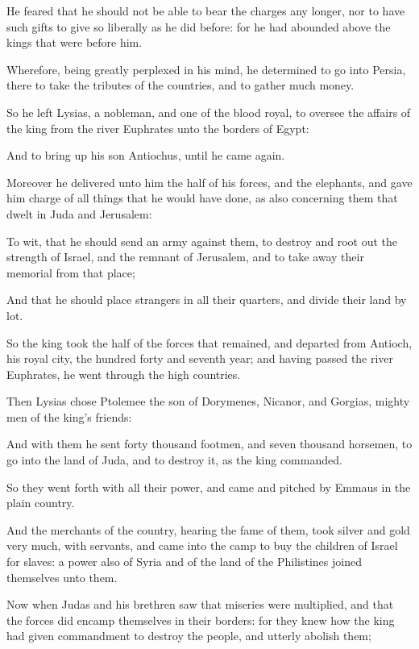{\par }{\PP {}He feared that he should not be able to bear the charges any longer, nor to have such gifts to give so liberally as he did before: for he had abounded above the kings that were before him.
\par }{\PP {}Wherefore, being greatly perplexed in his mind, he determined to go into Persia, there to take the tributes of the countries, and to gather much money.
\par }{\PP {}So he left Lysias, a nobleman, and one of the blood royal, to oversee the affairs of the king from the river Euphrates unto the borders of Egypt:
\par }{\PP {}And to bring up his son Antiochus, until he came again.
\par }{\PP {}Moreover he delivered unto him the half of his forces, and the elephants, and gave him charge of all things that he would have done, as also concerning them that dwelt in Juda and Jerusalem:
\par }{\PP {}To wit, that he should send an army against them, to destroy and root out the strength of Israel, and the remnant of Jerusalem, and to take away their memorial from that place;
\par }{\PP {}And that he should place strangers in all their quarters, and divide their land by lot.
\par }{\PP {}So the king took the half of the forces that remained, and departed from Antioch, his royal city, the hundred forty and seventh year; and having passed the river Euphrates, he went through the high countries.
\par }{\PP {}Then Lysias chose Ptolemee the son of Dorymenes, Nicanor, and Gorgias, mighty men of the king’s friends:
\par }{\PP {}And with them he sent forty thousand footmen, and seven thousand horsemen, to go into the land of Juda, and to destroy it, as the king commanded.
\par }{\PP {}So they went forth with all their power, and came and pitched by Emmaus in the plain country.
\par }{\PP {}And the merchants of the country, hearing the fame of them, took silver and gold very much, with servants, and came into the camp to buy the children of Israel for slaves: a power also of Syria and of the land of the Philistines joined themselves unto them.
\par }{\PP {}Now when Judas and his brethren saw that miseries were multiplied, and that the forces did encamp themselves in their borders: for they knew how the king had given commandment to destroy the people, and utterly abolish them;
}
